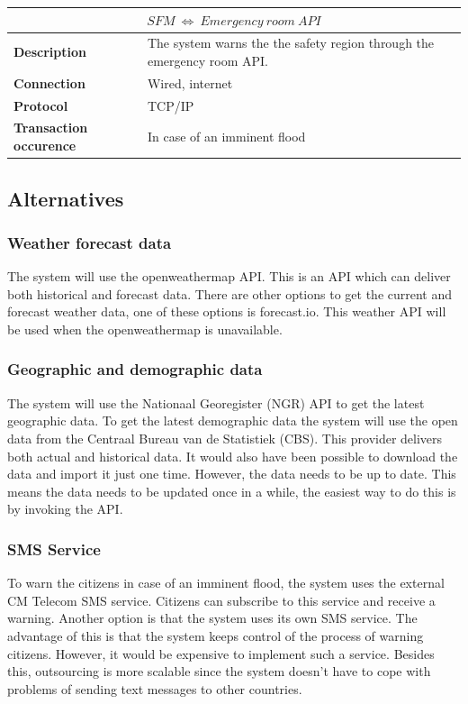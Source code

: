\begin{table}[H]
	\centering
	\begin{tabular}{L{} L{}}
		\toprule
		 \\ \midrule
		\textbf{Description}           & The system warns the the safety region through the emergency room API. \\
		\textbf{Connection}            & Wired, internet                                                        \\
		\textbf{Protocol}              & TCP/IP                                                                 \\
		\textbf{Transaction occurence} & In case of an imminent flood                                           \\
		\bottomrule
	\end{tabular}
\end{table}


\subsection{Alternatives}
\label{subsec:system-alter}
\subsubsection*{Weather forecast data}
The system will use the openweathermap API. This is an API which can deliver both historical and forecast data. There are other options to get the current and forecast weather data, one of these options is forecast.io. This weather API will be used when the openweathermap is unavailable. 

\subsubsection*{Geographic and demographic data}
The system will use the Nationaal Georegister (NGR) API to get the latest geographic data. To get the latest demographic data the system will use the open data from the Centraal Bureau van de Statistiek (CBS). This provider delivers both actual and historical data. It would also have been possible to download the data and import it just one time. However, the data needs to be up to date. This means the data needs to be updated once in a while, the easiest way to do this is by invoking the API.

\subsubsection*{SMS Service}
To warn the citizens in case of an imminent flood, the system uses the external CM Telecom SMS service. Citizens can subscribe to this service and receive a warning. Another option is that the system uses its own SMS service. The advantage of this is that the system keeps control of the process of warning citizens. However, it would be expensive to implement such a service. Besides this, outsourcing is more scalable since the system doesn't have to cope with problems of sending text messages to other countries.

